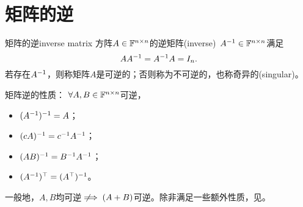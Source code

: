 \section{矩阵的逆}

\begin{definition}{矩阵的逆}{inverse matrix}
	方阵$A\in\mathbb F^{n\times n}$的逆矩阵(inverse)~$A^{-1}\in\mathbb F^{n\times n}$满足
	\[
		AA^{-1}=A^{-1} A=I_n.
	\]
	若存在$A^{-1}$，则称矩阵$A$是可逆的；否则称为不可逆的，也称奇异的(singular)。
\end{definition}

\begin{corollary}
	矩阵逆的性质：
	$\forall A,B\in\mathbb F^{n\times n}$可逆，
	\begin{itemize}
		\item $(A^{-1})^{-1}=A$；
		\item $(cA)^{-1}=c^{-1} A^{-1}$；
		\item $(AB)^{-1}=B^{-1} A^{-1}$；
		\item $(A^{-1})^\top=(A^\top)^{-1}$。
	\end{itemize}
\end{corollary}

\begin{remark}
	一般地，$A,B$均可逆$\hspace{1ex}\not\hspace{-1ex}\implies(A+B)$可逆。除非满足一些额外性质，见。
\end{remark}


